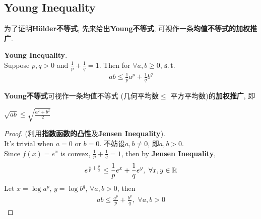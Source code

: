 \subsection{Young Inequality}
	为了证明\textbf{H\"{o}lder不等式}, 先来给出\textbf{Young不等式}, 可视作一条\textbf{均值不等式的加权推广}.
	\begin{thm}\label{thm 1.1.1}
		\textbf{Young Inequality}. \\
		Suppose $p , q > 0$ and $\frac{1}{p} + \frac{1}{q} = 1$. Then for $\forall a , b \geq 0$, $\operatorname{s.t.}$
		\begin{align}
			ab \leq \frac{1}{p} a^p + \frac{1}{q} b^q
		\end{align}
		
		\vspace{2em}
		\begin{rmk}
			\textbf{Young不等式}可视作一条均值不等式 (几何平均数$\leq$ 平方平均数)的\textbf{加权推广}, 即
			\begin{center}
				$\sqrt{ab} \leq \sqrt{\frac{a^2 + b^2}{2}}$
			\end{center}
		\end{rmk}
		
		\vspace{2em}
		\begin{proof}
			(利用\textbf{指数函数的凸性}及\textbf{Jensen Inequality}). \\
			It's trivial when $a = 0$ or $b = 0$. 不妨设$a , b \neq 0$, 即$a , b > 0$. \\
			Since $f(x) = e^x$ is convex, $\frac{1}{p} + \frac{1}{q} = 1$, then by \textbf{Jensen Inequality},
			\begin{align}
				e^{\frac{x}{p} + \frac{y}{q}} \leq \frac{1}{p} e^x + \frac{1}{q} e^y , \,\, \forall x , y \in \mathbb{R}
			\end{align}
			Let $x = \log{a^p}$, $y = \log{b^q}$, $\forall a , b > 0$, then
			\begin{align}
				ab \leq \frac{a^p}{p} + \frac{b^q}{q} , \,\, \forall a , b > 0
			\end{align}
		\end{proof}
	\end{thm}
	
